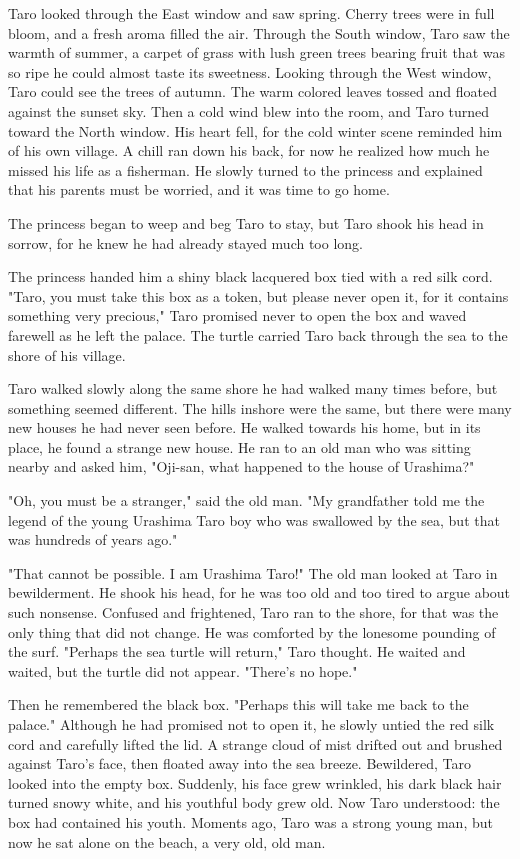 Taro looked through the East window and saw spring. Cherry trees were in full bloom, and a fresh aroma filled the air. Through the South window, Taro saw the warmth of summer, a carpet of grass with lush green trees bearing fruit that was so ripe he could almost taste its sweetness. Looking through the West window, Taro could see the trees of autumn. The warm colored leaves tossed and floated against the sunset sky. Then a cold wind blew into the room, and Taro turned toward the North window. His heart fell, for the cold winter scene reminded him of his own village. A chill ran down his back, for now he realized how much he missed his life as a fisherman. He slowly turned to the princess and explained that his parents must be worried, and it was time to go home.

The princess began to weep and beg Taro to stay, but Taro shook his head in sorrow, for he knew he had already stayed much too long.

The princess handed him a shiny black lacquered box tied with a red silk cord. "Taro, you must take this box as a token, but please never open it, for it contains something very precious," Taro promised never to open the box and waved farewell as he left the palace. The turtle carried Taro back through the sea to the shore of his village.

Taro walked slowly along the same shore he had walked many times before, but something seemed different. The hills inshore were the same, but there were many new houses he had never seen before. He walked towards his home, but in its place, he found a strange new house. He ran to an old man who was sitting nearby and asked him, "Oji-san, what happened to the house of Urashima?"

"Oh, you must be a stranger," said the old man. "My grandfather told me the legend of the young Urashima Taro boy who was swallowed by the sea, but that was hundreds of years ago."

"That cannot be possible. I am Urashima Taro!" The old man looked at Taro in bewilderment. He shook his head, for he was too old and too tired to argue about such nonsense. Confused and frightened, Taro ran to the shore, for that was the only thing that did not change. He was comforted by the lonesome pounding of the surf. "Perhaps the sea turtle will return," Taro thought. He waited and waited, but the turtle did not appear. "There's no hope."

Then he remembered the black box. "Perhaps this will take me back to the palace." Although he had promised not to open it, he slowly untied the red silk cord and carefully lifted the lid. A strange cloud of mist drifted out and brushed against Taro's face, then floated away into the sea breeze. Bewildered, Taro looked into the empty box. Suddenly, his face grew wrinkled, his dark black hair turned snowy white, and his youthful body grew old. Now Taro understood: the box had contained his youth. Moments ago, Taro was a strong young man, but now he sat alone on the beach, a very old, old man.

